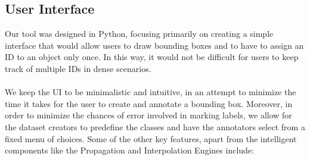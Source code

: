 



\subsection{User Interface}

Our tool was designed in Python, focusing primarily on creating a simple interface that would allow users to draw bounding boxes and to have to assign an ID to an object only once. In this way, it would not be difficult for users to keep track of multiple IDs in dense scenarios.
\paragraph{}We keep the UI to be minimalistic and intuitive, in an attempt to minimize the time it takes for the user to create and annotate a bounding box. Moreover, in order to minimize the chances of error involved in marking labels, we allow for the dataset creators to predefine the classes and have the annotators select from a fixed menu of choices. Some of the other key features, apart from the intelligent components like the Propagation and Interpolation Engines include:

